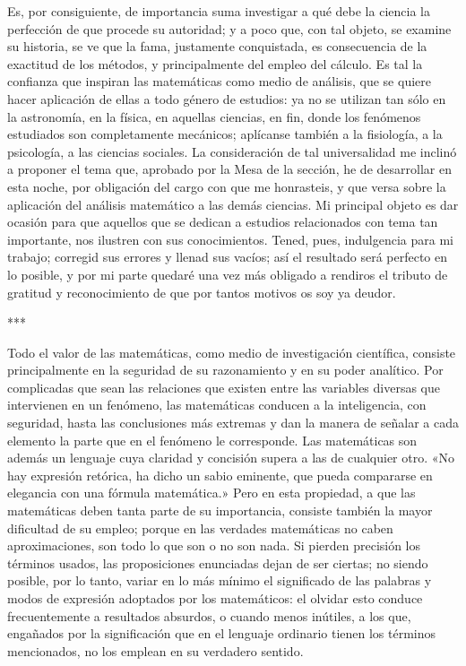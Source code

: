 \documentclass[a4paper, 12pt]{article}
\begin{document}
Es, por consiguiente, de importancia suma investigar a qué debe la ciencia la perfección de que procede su autoridad; y a poco que, con tal objeto, se examine su historia, se ve que la fama, justamente conquistada, es consecuencia de la exactitud de los métodos, y principalmente del empleo del cálculo. Es tal la confianza que inspiran las matemáticas como medio de análisis, que se quiere hacer aplicación de ellas a todo género de estudios: ya no se utilizan tan sólo en la astronomía, en la física, en aquellas ciencias, en fin, donde los fenómenos estudiados son completamente mecánicos; aplícanse también a la fisiología, a la psicología, a las ciencias sociales. La consideración de tal universalidad me inclinó a proponer el tema que, aprobado por la Mesa de la sección, he de desarrollar en esta noche, por obligación del cargo con que me honrasteis, y que versa sobre la aplicación del análisis matemático a las demás ciencias. Mi principal objeto es dar ocasión para que aquellos que se dedican a estudios relacionados con tema tan importante, nos ilustren con sus conocimientos. Tened, pues, indulgencia para mi trabajo; corregid sus errores y llenad sus vacíos; así el resultado será perfecto en lo posible, y por mi parte quedaré una vez más obligado a rendiros el tributo de gratitud y reconocimiento de que por tantos motivos os soy ya deudor.

\bigskip

\centerline{***}

Todo el valor de las matemáticas, como medio de investigación científica, consiste principalmente en la seguridad de su razonamiento y en su poder analítico. Por complicadas que sean las relaciones que existen entre las variables diversas que intervienen en un fenómeno, las matemáticas conducen a la inteligencia, con seguridad, hasta las conclusiones más extremas y dan la manera de señalar a cada elemento la parte que en el fenómeno le corresponde. Las matemáticas son además un lenguaje cuya claridad y concisión supera a las de cualquier otro. «No hay expresión retórica, ha dicho un sabio eminente, que pueda compararse en elegancia con una fórmula matemática.» Pero en esta propiedad, a que las matemáticas deben tanta parte de su importancia, consiste también la mayor dificultad de su empleo; porque en las verdades matemáticas no caben aproximaciones, son todo lo que son o no son nada. Si pierden precisión los términos usados, las proposiciones enunciadas dejan de ser ciertas; no siendo posible, por lo tanto, variar en lo más mínimo el significado de las palabras y modos de expresión adoptados por los matemáticos: el olvidar esto conduce frecuentemente a resultados absurdos, o cuando menos inútiles, a los que, engañados por la significación que en el lenguaje ordinario tienen los términos mencionados, no los emplean en su verdadero sentido.
\end{document}
